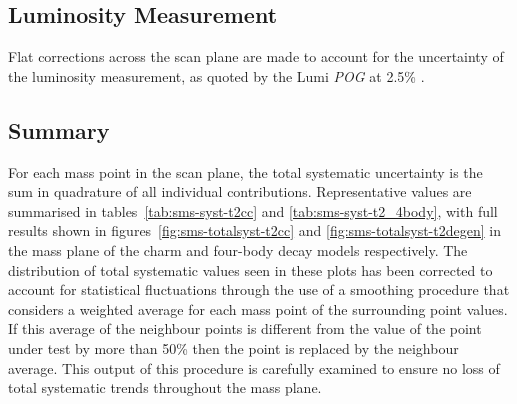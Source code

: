 \subsection{Luminosity Measurement}
Flat corrections across the scan plane are made to account for the uncertainty 
of the luminosity measurement, as quoted by the Lumi \emph{POG} at 2.5\%
\cite{CMS:2013gfa}.

\subsection{Summary}
For each mass point in the scan plane, the total systematic uncertainty is the sum in 
quadrature of all individual contributions. Representative values are summarised
in tables~\ref{tab:sms-syst-t2cc} and \ref{tab:sms-syst-t2_4body}, with full
results shown in figures~\ref{fig:sms-totalsyst-t2cc} and
\ref{fig:sms-totalsyst-t2degen} in the mass plane of the charm and four-body
decay models respectively. The distribution of total systematic values seen
in these plots has been corrected to account for statistical fluctuations through
the use of a smoothing procedure that considers a weighted average
for each mass point of the surrounding point values. If this average of the neighbour points
is different from the value of the point under test by more than 50\% then the
point is replaced by the neighbour average. This output of this procedure is
carefully examined to ensure no loss of total systematic trends throughout the
mass plane.

